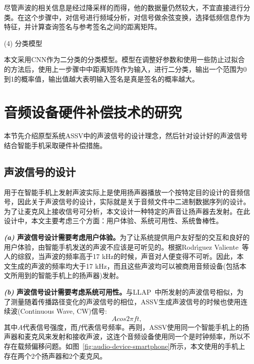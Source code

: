 尽管声波的相关信息是经过降采样的而得，他的数据量仍然较大，不宜直接进行分类。在这个步骤中，对信号进行频域分析，对信号做余弦变换，选择低频信息作为特征，并计算查询签名与参考签名之间的距离矩阵。

(4) 分类模型

本文采用CNN作为二分类的分类模型。模型在调整好参数和使用一些防止过拟合的方法后，使用上一步骤中中距离矩阵作为输入，进行二分类，输出一个范围为0到1的概率值，输出值越大表明输入签名是真是签名的概率越大。

\section{音频设备硬件补偿技术的研究}\label{sec:audio-research}

本节先介绍原型系统ASSV中的声波信号的设计理念，然后针对设计好的声波信号结合智能手机采取硬件补偿措施。

\subsection{声波信号的设计}

用于在智能手机上发射声波实际上是使用扬声器播放一个按特定目的设计的音频信号，因此关于声波信号的设计，实际就是关于音频文件中二进制数据序列的设计。为了让麦克风上接收信号可分析，本文设计一种特定的声音让扬声器去发射。在此设计中，本文主要考虑三个方面：用户体验、系统可用性、系统鲁棒性。

\textbf{\textit{(a)} 声波信号设计需要考虑用户体验。}为了让系统提供用户友好型的交互和良好的用户体验，由智能手机发送的声波不应该是可听见的。根据Rodr{\'\i}guez Valiente~\cite{rodriguez2014extended}等人的综叙，当声波的频率高于17 kHz的时候，声音对人便变得不可听。因此，本文生成的声波的频率均大于17 kHz，而且这些声波均可以被商用音频设备(包括本文所用到的智能手机上的扬声器)发射。

\textbf{\textit{(b)} 声波信号设计需要考虑系统可用性。}与LLAP~\cite{wang2016device}中所发射的声波信号相似，为了测量随着传播路径变化的声波信号的相位，ASSV生成声波信号的时候也使用连续波(Continuous Wave, CW)信号:
$$
Acos2\pi ft, 
$$
其中$A$代表信号强度，而$f$代表信号频率。再则，ASSV使用同一个智能手机上的扬声器和麦克风来发射和接收声波，这连个音频设备使用同一个是时钟频率，所以不存在载频偏移问题。如图~\ref{fig:audio-device-smartphone}所示，本文使用的手机上存在两个2个扬声器和2个麦克风。


